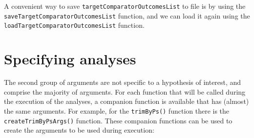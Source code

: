 \documentclass[
]{article}
\begin{document}
A convenient way to save \texttt{targetComparatorOutcomesList} to file
is by using the \texttt{saveTargetComparatorOutcomesList} function, and
we can load it again using the \texttt{loadTargetComparatorOutcomesList}
function.

\hypertarget{specifying-analyses}{%
\section{Specifying analyses}\label{specifying-analyses}}

The second group of arguments are not specific to a hypothesis of
interest, and comprise the majority of arguments. For each function that
will be called during the execution of the analyses, a companion
function is available that has (almost) the same arguments. For example,
for the \texttt{trimByPs()} function there is the
\texttt{createTrimByPsArgs()} function. These companion functions can be
used to create the arguments to be used during execution:
\end{document}
